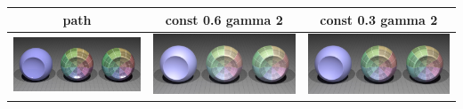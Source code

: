 \documentclass[11pt]{article}
\begin{document}
\begin{table}[ht]
  \centering
  \begin{tabular}{ | c | c | c |}
    \hline
    path & const 0.6 gamma 2 & const 0.3 gamma 2 \\ \hline
    \begin{minipage}{.3\textwidth}
      \includegraphics[scale=0.1]{img/obj/normalmap_pl/normalmap_pl.jpg}
    \end{minipage}
    &
    \begin{minipage}{.3\textwidth}
      \includegraphics[scale=0.1]{img/obj/normalmap_pl/normalmap_pl_disney.jpg}
    \end{minipage}
    & 
    \begin{minipage}{.3\textwidth}
      \includegraphics[scale=0.1]{img/obj/normalmap_pl/normalmap_pl_disney_dc03.jpg}
    \end{minipage}
    \\ \hline
  \end{tabular}
\end{table}
\end{document}
